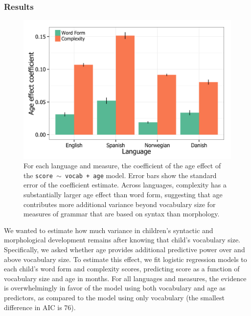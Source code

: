 \documentclass[10pt,letterpaper]{article}
\begin{document}

\subsubsection{Results}

\begin{figure}
\begin{center}
\includegraphics[width=\linewidth]{plots/coefs_wordform_complexity.png}
\end{center}
\caption{\label{fig:coefs_grammar}  For each language and measure, the coefficient of the age effect of the \small{\tt{score $\sim$ vocab + age}} model. Error bars show the standard error of the coefficient estimate. Across languages, complexity has a substantially larger age effect than word form, suggesting that age contributes more additional variance beyond vocabulary size for measures of grammar that are based on syntax than morphology.} 
\end{figure}

We wanted to estimate how much variance in children's syntactic and morphological development remains after knowing that child's vocabulary size. Specifically, we asked whether age provides additional predictive power over and above vocabulary size. To estimate this effect, we fit logistic regression models to each child's word form and complexity scores, predicting score as a function of vocabulary size and age in months. For all languages and measures, the evidence is overwhelmingly in favor of the model using both vocabulary and age as predictors, as compared to the model using only vocabulary (the smallest difference in AIC is 76). %
\end{document}
